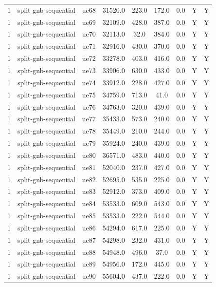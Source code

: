 \begin{table}[ht]
\begin{tabular}{|c|c|c|c|c|c|c|c|c|}
1 & split-gnb-sequential & ue68 & 31520.0 & 223.0 & 172.0 & 0.0 & Y & Y \\
1 & split-gnb-sequential & ue69 & 32109.0 & 428.0 & 387.0 & 0.0 & Y & Y \\
1 & split-gnb-sequential & ue70 & 32113.0 & 32.0 & 384.0 & 0.0 & Y & Y \\
1 & split-gnb-sequential & ue71 & 32916.0 & 430.0 & 370.0 & 0.0 & Y & Y \\
1 & split-gnb-sequential & ue72 & 33278.0 & 403.0 & 416.0 & 0.0 & Y & Y \\
1 & split-gnb-sequential & ue73 & 33906.0 & 630.0 & 433.0 & 0.0 & Y & Y \\
1 & split-gnb-sequential & ue74 & 33912.0 & 228.0 & 427.0 & 0.0 & Y & Y \\
1 & split-gnb-sequential & ue75 & 34759.0 & 713.0 & 41.0 & 0.0 & Y & Y \\
1 & split-gnb-sequential & ue76 & 34763.0 & 320.0 & 439.0 & 0.0 & Y & Y \\
1 & split-gnb-sequential & ue77 & 35433.0 & 573.0 & 240.0 & 0.0 & Y & Y \\
1 & split-gnb-sequential & ue78 & 35449.0 & 210.0 & 244.0 & 0.0 & Y & Y \\
1 & split-gnb-sequential & ue79 & 35924.0 & 240.0 & 439.0 & 0.0 & Y & Y \\
1 & split-gnb-sequential & ue80 & 36571.0 & 483.0 & 440.0 & 0.0 & Y & Y \\
1 & split-gnb-sequential & ue81 & 52040.0 & 237.0 & 427.0 & 0.0 & Y & Y \\
1 & split-gnb-sequential & ue82 & 52695.0 & 535.0 & 225.0 & 0.0 & Y & Y \\
1 & split-gnb-sequential & ue83 & 52912.0 & 373.0 & 409.0 & 0.0 & Y & Y \\
1 & split-gnb-sequential & ue84 & 53533.0 & 609.0 & 543.0 & 0.0 & Y & Y \\
1 & split-gnb-sequential & ue85 & 53533.0 & 222.0 & 544.0 & 0.0 & Y & Y \\
1 & split-gnb-sequential & ue86 & 54294.0 & 617.0 & 225.0 & 0.0 & Y & Y \\
1 & split-gnb-sequential & ue87 & 54298.0 & 232.0 & 431.0 & 0.0 & Y & Y \\
1 & split-gnb-sequential & ue88 & 54948.0 & 496.0 & 37.0 & 0.0 & Y & Y \\
1 & split-gnb-sequential & ue89 & 54956.0 & 172.0 & 445.0 & 0.0 & Y & Y \\
1 & split-gnb-sequential & ue90 & 55604.0 & 437.0 & 222.0 & 0.0 & Y & Y \\

\end{tabular}
\end{table}
